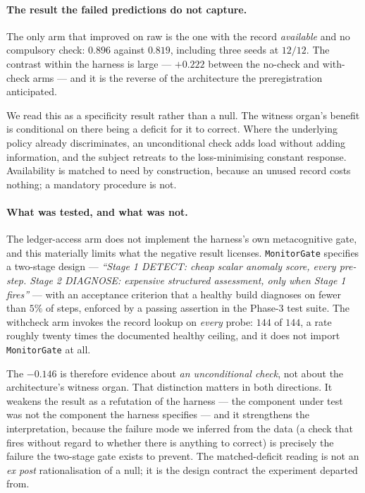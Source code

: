 \documentclass[11pt]{article}
\begin{document}
\paragraph{The result the failed predictions do not capture.} The only arm
that improved on raw is the one with the record \emph{available} and no
compulsory check: $0.896$ against $0.819$, including three seeds at
$12/12$. The contrast within the harness is large --- $+0.222$ between the
no-check and with-check arms --- and it is the reverse of the architecture
the preregistration anticipated.

We read this as a specificity result rather than a null. The witness
organ's benefit is conditional on there being a deficit for it to correct.
Where the underlying policy already discriminates, an unconditional check
adds load without adding information, and the subject retreats to the
loss-minimising constant response. Availability is matched to need by
construction, because an unused record costs nothing; a mandatory
procedure is not.

\paragraph{What was tested, and what was not.} The ledger-access arm does not
implement the harness's own metacognitive gate, and this materially limits what
the negative result licenses. \texttt{MonitorGate} specifies a two-stage design
--- \emph{``Stage 1 DETECT: cheap scalar anomaly score, every pre-step. Stage 2
DIAGNOSE: expensive structured assessment, only when Stage 1 fires''} --- with
an acceptance criterion that a healthy build diagnoses on fewer than $5\%$ of
steps, enforced by a passing assertion in the Phase-3 test suite. The
withcheck arm invokes the record lookup on \emph{every} probe: $144$ of $144$,
a rate roughly twenty times the documented healthy ceiling, and it does not
import \texttt{MonitorGate} at all.

The $-0.146$ is therefore evidence about \emph{an unconditional check}, not
about the architecture's witness organ. That distinction matters in both
directions. It weakens the result as a refutation of the harness --- the
component under test was not the component the harness specifies --- and it
strengthens the interpretation, because the failure mode we inferred from the
data (a check that fires without regard to whether there is anything to
correct) is precisely the failure the two-stage gate exists to prevent. The
matched-deficit reading is not an \emph{ex post} rationalisation of a null; it
is the design contract the experiment departed from.
\end{document}
